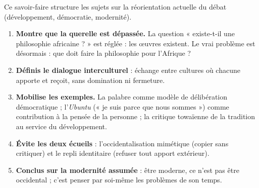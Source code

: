 \documentclass[11pt]{article}
\begin{document}
\begin{methode}
Ce savoir-faire structure les sujets sur la réorientation actuelle du débat (développement, démocratie, modernité).

\begin{enumerate}
\item \textbf{Montre que la querelle est dépassée.} La question « existe-t-il une philosophie africaine ? » est réglée : les œuvres existent. Le vrai problème est désormais : que doit faire la philosophie pour l'Afrique ?
\item \textbf{Définis le dialogue interculturel} : échange entre cultures où chacune apporte et reçoit, sans domination ni fermeture.
\item \textbf{Mobilise les exemples.} La palabre comme modèle de délibération démocratique ; l'\emph{Ubuntu} (« je suis parce que nous sommes ») comme contribution à la pensée de la personne ; la critique towaïenne de la tradition au service du développement.
\item \textbf{Évite les deux écueils} : l'occidentalisation mimétique (copier sans critiquer) et le repli identitaire (refuser tout apport extérieur).
\item \textbf{Conclus sur la modernité assumée} : être moderne, ce n'est pas être occidental ; c'est penser par soi-même les problèmes de son temps.
\end{enumerate}
\end{methode}
\end{document}
